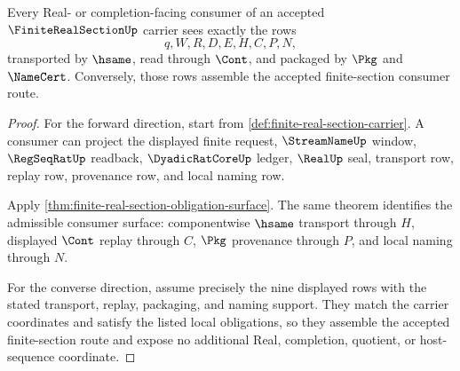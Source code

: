 \begin{theorem}
\label{thm:finite-real-section-route-consumer-exactness}
Every Real- or completion-facing consumer of an accepted $\FiniteRealSectionUp$ carrier sees exactly the rows
$$
q,W,R,D,E,H,C,P,N,
$$
transported by $\hsame$, read through $\Cont$, and packaged by $\Pkg$ and $\NameCert$. Conversely, those rows assemble the accepted finite-section consumer route.
\end{theorem}
\begin{proof}
For the forward direction, start from \autoref{def:finite-real-section-carrier}. A consumer can project the displayed finite request, $\StreamNameUp$ window, $\RegSeqRatUp$ readback, $\DyadicRatCoreUp$ ledger, $\RealUp$ seal, transport row, replay row, provenance row, and local naming row.

Apply \autoref{thm:finite-real-section-obligation-surface}. The same theorem identifies the admissible consumer surface: componentwise $\hsame$ transport through $H$, displayed $\Cont$ replay through $C$, $\Pkg$ provenance through $P$, and local naming through $N$.

For the converse direction, assume precisely the nine displayed rows with the stated transport, replay, packaging, and naming support. They match the carrier coordinates and satisfy the listed local obligations, so they assemble the accepted finite-section route and expose no additional Real, completion, quotient, or host-sequence coordinate.
\end{proof}

